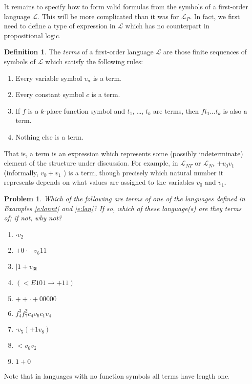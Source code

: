 \documentclass[12pt]{amsbook}
\theoremstyle{plain}
\newtheorem{prob}[thm]{Problem}
\theoremstyle{definition}
\newtheorem{defn}{Definition}[chapter]
\theoremstyle{remark}
\begin{document}
It remains to specify how to form valid formulas from the symbols of a first-order language $\mathcal{L}$.  This will be more complicated than it was for $\mathcal{L}_P$.  In fact,  we first need to define a type of expression in $\mathcal{L}$ which has no counterpart in propositional logic.

\begin{defn} \label{d:ter} 
The {\em terms\/} of a first-order language $\mathcal{L}$ are those finite sequences of symbols of $\mathcal{L}$ which satisfy the following rules:
\begin{enumerate}
\item Every variable symbol $v_n$ is a term.
\item Every constant symbol $c$ is a term.
\item If $f$ is a $k$-place function symbol and $t_1$,  \dots, $t_k$ are terms,  then $f t_1 \dots t_k$ is also a term.
\item Nothing else is a term.
\end{enumerate}
\end{defn}

That is,  a term is an expression which represents some (possibly
indeterminate) element of the structure under discussion.  For example,  in $\mathcal{L}_{NT}$ or $\mathcal{L}_N$,   $+ v_0 v_1$ (informally,  $v_0 + v_1$ ) is a term,  though precisely which natural number it represents depends on what values are assigned to the variables $v_0$ and $v_1$.   

\begin{prob} \label{p:five1}
Which of the following are terms of one of the languages defined in Examples \ref{e:lannt} and \ref{e:lan}?  If so,  which of these language(s) are they terms of;  if not,  why not?
\begin{enumerate}
\item $\cdot v_2$
\item $+ 0 \cdot + v_6 1 1$
\item $|1+v_30$
\item $(<E101 \to +11)$
\item $++\cdot +00000$
\item $f^3_4f^2_7 c_4 v_9 c_1 v_4$
\item $\cdot v_5 (+1v_8)$
\item $< v_6 v_2$
\item $1 + 0$
\end{enumerate}
\end{prob}

Note that in languages with no function symbols all terms have length one.
\end{document}
